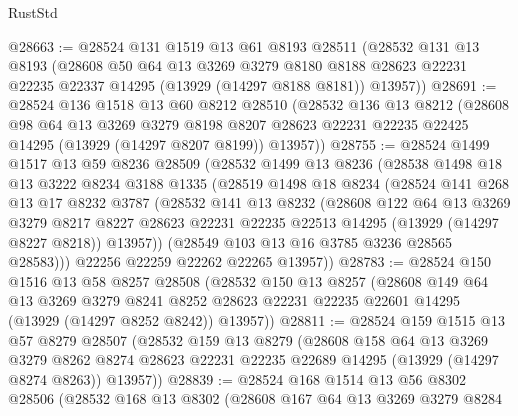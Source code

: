 \begin{lexlean}{RustStd}
\begin{coremodule}
@28663 := @28524
    @131
    @1519
    @13
    @61
    @8193
    @28511
    (@28532
      @131
      @13
      @8193
      (@28608
        @50
        @64
        @13
        @3269
        @3279
        @8180
        @8188
        @28623
        @22231
        @22235
        @22337
        @14295
        (@13929 (@14297 @8188 @8181))
        @13957))
@28691 := @28524
    @136
    @1518
    @13
    @60
    @8212
    @28510
    (@28532
      @136
      @13
      @8212
      (@28608
        @98
        @64
        @13
        @3269
        @3279
        @8198
        @8207
        @28623
        @22231
        @22235
        @22425
        @14295
        (@13929 (@14297 @8207 @8199))
        @13957))
@28755 := @28524
    @1499
    @1517
    @13
    @59
    @8236
    @28509
    (@28532
      @1499
      @13
      @8236
      (@28538
        @1498
        @18
        @13
        @3222
        @8234
        @3188
        @1335
        (@28519
          @1498
          @18
          @8234
          (@28524
            @141
            @268
            @13
            @17
            @8232
            @3787
            (@28532
              @141
              @13
              @8232
              (@28608
                @122
                @64
                @13
                @3269
                @3279
                @8217
                @8227
                @28623
                @22231
                @22235
                @22513
                @14295
                (@13929 (@14297 @8227 @8218))
                @13957))
            (@28549 @103 @13 @16 @3785 @3236 @28565 @28583)))
        @22256
        @22259
        @22262
        @22265
        @13957))
@28783 := @28524
    @150
    @1516
    @13
    @58
    @8257
    @28508
    (@28532
      @150
      @13
      @8257
      (@28608
        @149
        @64
        @13
        @3269
        @3279
        @8241
        @8252
        @28623
        @22231
        @22235
        @22601
        @14295
        (@13929 (@14297 @8252 @8242))
        @13957))
@28811 := @28524
    @159
    @1515
    @13
    @57
    @8279
    @28507
    (@28532
      @159
      @13
      @8279
      (@28608
        @158
        @64
        @13
        @3269
        @3279
        @8262
        @8274
        @28623
        @22231
        @22235
        @22689
        @14295
        (@13929 (@14297 @8274 @8263))
        @13957))
@28839 := @28524
    @168
    @1514
    @13
    @56
    @8302
    @28506
    (@28532
      @168
      @13
      @8302
      (@28608
        @167
        @64
        @13
        @3269
        @3279
        @8284

\end{coremodule}
\end{lexlean}
